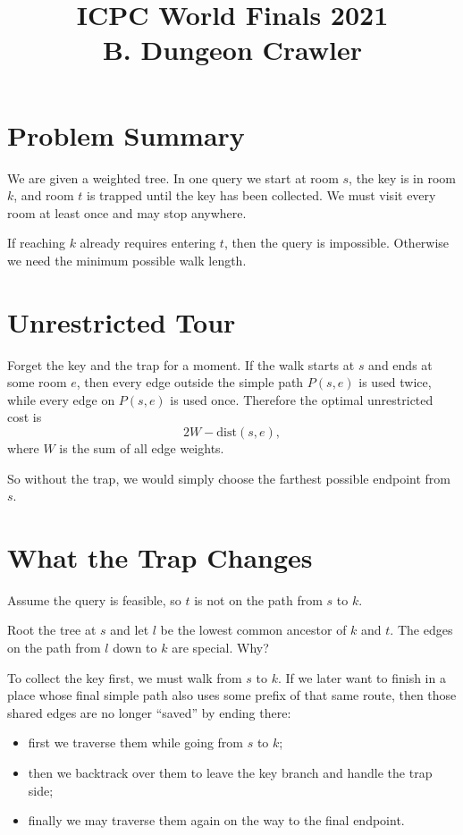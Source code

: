 \documentclass[11pt]{article}
\title{ICPC World Finals 2021\\B. Dungeon Crawler}
\author{}
\date{}
\begin{document}
\maketitle

\section*{Problem Summary}

We are given a weighted tree. In one query we start at room $s$, the key is in room $k$, and room $t$
is trapped until the key has been collected. We must visit every room at least once and may stop
anywhere.

If reaching $k$ already requires entering $t$, then the query is impossible. Otherwise we need the minimum
possible walk length.

\section*{Unrestricted Tour}

Forget the key and the trap for a moment. If the walk starts at $s$ and ends at some room $e$, then every
edge outside the simple path $P(s,e)$ is used twice, while every edge on $P(s,e)$ is used once. Therefore
the optimal unrestricted cost is
\[
    2W - \mathrm{dist}(s,e),
\]
where $W$ is the sum of all edge weights.

So without the trap, we would simply choose the farthest possible endpoint from $s$.

\section*{What the Trap Changes}

Assume the query is feasible, so $t$ is not on the path from $s$ to $k$.

Root the tree at $s$ and let $l$ be the lowest common ancestor of $k$ and $t$. The edges on the path
from $l$ down to $k$ are special. Why?

To collect the key first, we must walk from $s$ to $k$. If we later want to finish in a place whose final
simple path also uses some prefix of that same route, then those shared edges are no longer ``saved'' by
ending there:
\begin{itemize}[leftmargin=*]
    \item first we traverse them while going from $s$ to $k$;
    \item then we backtrack over them to leave the key branch and handle the trap side;
    \item finally we may traverse them again on the way to the final endpoint.
\end{itemize}
\end{document}
